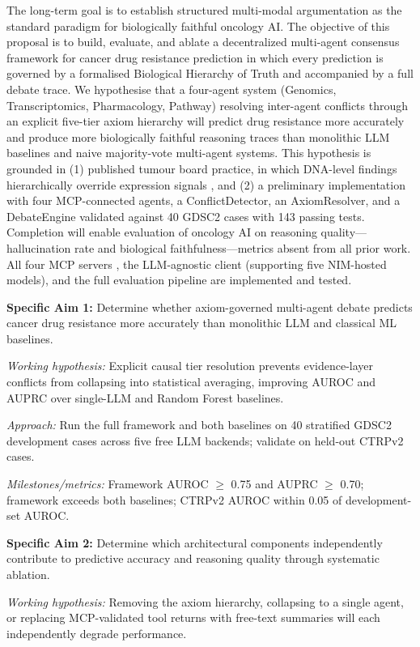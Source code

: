 \documentclass[11pt,letterpaper]{article}
\begin{document}
The long-term goal is to establish structured multi-modal argumentation as the standard paradigm
for biologically faithful oncology AI. The objective of this proposal is to build, evaluate, and
ablate a decentralized multi-agent consensus framework for cancer drug resistance prediction
in which every prediction is governed by a formalised Biological Hierarchy of Truth and
accompanied by a full debate trace. We hypothesise that a four-agent system (Genomics,
Transcriptomics, Pharmacology, Pathway) resolving inter-agent conflicts through an explicit
five-tier axiom hierarchy will predict drug resistance more accurately and produce more
biologically faithful reasoning traces than monolithic LLM baselines and naive majority-vote
multi-agent systems. This hypothesis is grounded in (1) published tumour board practice, in
which DNA-level findings hierarchically override expression signals \cite{ref12}, and (2) a
preliminary implementation with four MCP-connected agents, a ConflictDetector, an
AxiomResolver, and a DebateEngine validated against 40 GDSC2 cases with 143 passing tests.
Completion will enable evaluation of oncology AI on reasoning quality---hallucination rate and
biological faithfulness---metrics absent from all prior work. All four MCP servers
\cite{ref15,ref16}, the LLM-agnostic client (supporting five NIM-hosted models), and the full
evaluation pipeline are implemented and tested.

\textbf{Specific Aim 1:} Determine whether axiom-governed multi-agent debate predicts cancer
drug resistance more accurately than monolithic LLM and classical ML baselines.

\textit{Working hypothesis:} Explicit causal tier resolution prevents evidence-layer conflicts from
collapsing into statistical averaging, improving AUROC and AUPRC over single-LLM and
Random Forest baselines.

\textit{Approach:} Run the full framework and both baselines on 40 stratified GDSC2 development
cases across five free LLM backends; validate on held-out CTRPv2 cases.

\textit{Milestones/metrics:} Framework AUROC $\geq$ 0.75 and AUPRC $\geq$ 0.70; framework exceeds
both baselines; CTRPv2 AUROC within 0.05 of development-set AUROC.

\textbf{Specific Aim 2:} Determine which architectural components independently contribute to
predictive accuracy and reasoning quality through systematic ablation.

\textit{Working hypothesis:} Removing the axiom hierarchy, collapsing to a single agent, or replacing
MCP-validated tool returns with free-text summaries will each independently degrade performance.
\end{document}
